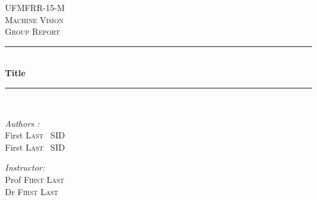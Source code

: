 \begin{titlepage}
\linespread{1.0} %
\setlength{\parskip}{0pt} %
\newcommand{\HRule}{\rule{\linewidth}{0.1mm}} 
\center %
 
\textsc{\Large UFMFRR-15-M}\\[0.5cm] %
\textsc{\Large Machine Vision}\\[0.5cm] %
\textsc{\large Group Report}\\[0.5cm] %

\HRule \\[0.4cm]
{ \huge \bfseries Title}\\[0.1cm] %
\HRule \\[1.5cm]
 

\begin{minipage}{0.4\textwidth}
\begin{flushleft} \large

\emph{Authors :}\\ \vspace{0.5em}
First \textsc{Last} \ SID \\ \vspace{0.5em}
First \textsc{Last} \ SID \\ \vspace{0.5em}
\end{flushleft}

\end{minipage}
\begin{minipage}{0.4\textwidth}
\begin{flushright} \large
\emph{Instructor:} \\
Prof \textsc{First Last} \\
Dr \textsc{First Last} %
\end{flushright}
\end{minipage}\\[1cm]


\end{titlepage}
